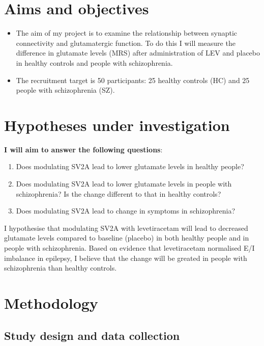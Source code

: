 \documentclass[
  letterpaper,
  DIV=11,
  numbers=noendperiod]{scrartcl}
\providecommand{\tightlist}{%
  \setlength{\itemsep}{0pt}\setlength{\parskip}{0pt}}\usepackage{longtable,booktabs,array}
\begin{document}
\section{Aims and objectives}\label{aims-and-objectives}

\begin{itemize}
\tightlist
\item
  The aim of my project is to examine the relationship between synaptic
  connectivity and glutamatergic function. To do this I will measure the
  difference in glutamate levels (MRS) after administration of LEV and
  placebo in healthy controls and people with schizophrenia.
\item
  The recruitment target is 50 participants: 25 healthy controls (HC)
  and 25 people with schizophrenia (SZ).
\end{itemize}

\section{Hypotheses under
investigation}\label{hypotheses-under-investigation}

\textbf{I will aim to answer the following questions}:

\begin{enumerate}
\def\labelenumi{\arabic{enumi}.}
\tightlist
\item
  Does modulating SV2A lead to lower glutamate levels in healthy people?
\item
  Does modulating SV2A lead to lower glutamate levels in people with
  schizophrenia? Is the change different to that in healthy controls?
\item
  Does modulating SV2A lead to change in symptoms in schizophrenia?
\end{enumerate}

I hypothesise that modulating SV2A with levetiracetam will lead to
decreased glutamate levels compared to baseline (placebo) in both
healthy people and in people with schizophrenia. Based on evidence that
levetiracetam normalised E/I imbalance in epilepsy, I believe that the
change will be greated in people with schizophrenia than healthy
controls.

\section{Methodology}\label{methodology}

\subsection{Study design and data
collection}\label{study-design-and-data-collection}
\end{document}
